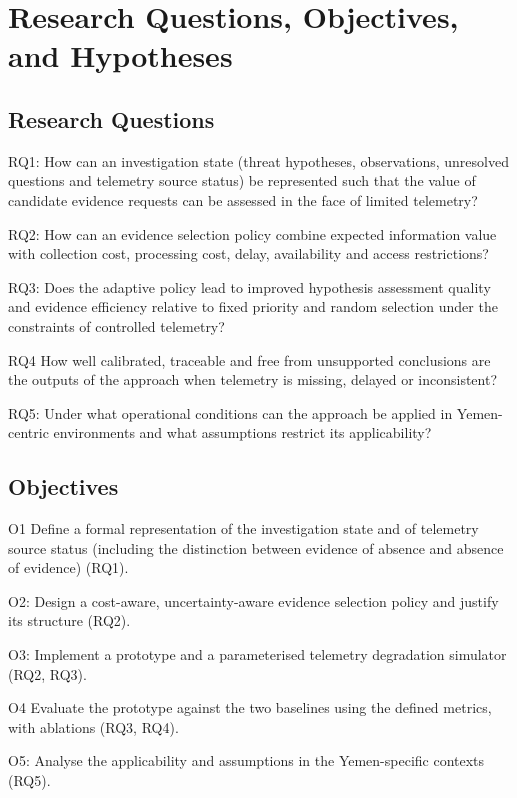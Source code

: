 \documentclass[a4paper,11pt]{article}
\begin{document}
\section{Research Questions, Objectives, and Hypotheses}
\subsection{Research Questions}
RQ1: How can an investigation state (threat hypotheses, observations, unresolved questions and telemetry source status) be represented such that the value of candidate evidence requests can be assessed in the face of limited telemetry?\par
RQ2: How can an evidence selection policy combine expected information value with collection cost, processing cost, delay, availability and access restrictions?\par
RQ3: Does the adaptive policy lead to improved hypothesis assessment quality and evidence efficiency relative to fixed priority and random selection under the constraints of controlled telemetry?\par
RQ4 How well calibrated, traceable and free from unsupported conclusions are the outputs of the approach when telemetry is missing, delayed or inconsistent?\par
RQ5: Under what operational conditions can the approach be applied in Yemen-centric environments and what assumptions restrict its applicability?\par
\subsection{Objectives}
O1 Define a formal representation of the investigation state and of telemetry source status (including the distinction between evidence of absence and absence of evidence) (RQ1).\par
O2: Design a cost-aware, uncertainty-aware evidence selection policy and justify its structure (RQ2).\par
O3: Implement a prototype and a parameterised telemetry degradation simulator (RQ2, RQ3).\par
O4 Evaluate the prototype against the two baselines using the defined metrics, with ablations (RQ3, RQ4).\par
O5: Analyse the applicability and assumptions in the Yemen-specific contexts (RQ5).\par
\end{document}
